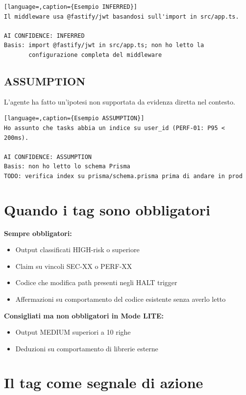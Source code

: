 \begin{lstlisting}[language=,caption={Esempio INFERRED}]
Il middleware usa @fastify/jwt basandosi sull'import in src/app.ts.

AI CONFIDENCE: INFERRED
Basis: import @fastify/jwt in src/app.ts; non ho letto la
       configurazione completa del middleware
\end{lstlisting}

\subsection*{ASSUMPTION}

L'agente ha fatto un'ipotesi non supportata da evidenza diretta nel contesto.

\begin{lstlisting}[language=,caption={Esempio ASSUMPTION}]
Ho assunto che tasks abbia un indice su user_id (PERF-01: P95 < 200ms).

AI CONFIDENCE: ASSUMPTION
Basis: non ho letto lo schema Prisma
TODO: verifica index su prisma/schema.prisma prima di andare in prod
\end{lstlisting}

\section{Quando i tag sono obbligatori}
\label{sec:09-quando-obbligatori}

\textbf{Sempre obbligatori:}
\begin{itemize}
  \item Output classificati HIGH-risk o superiore
  \item Claim su vincoli SEC-XX o PERF-XX
  \item Codice che modifica path presenti negli HALT trigger
  \item Affermazioni su comportamento del codice esistente senza averlo letto
\end{itemize}

\textbf{Consigliati ma non obbligatori in Mode LITE:}
\begin{itemize}
  \item Output MEDIUM superiori a 10 righe
  \item Deduzioni su comportamento di librerie esterne
\end{itemize}

\section{Il tag come segnale di azione}
\label{sec:09-segnale}

